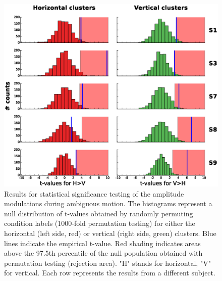 \begin{figure}[htbp!]
\centering
\includegraphics[width=\textwidth]{figures/chapter_03_SI/figS4.eps}
\caption{Results for statistical significance testing of the amplitude modulations during ambiguous motion. The histograms represent a null distribution of t-values obtained by randomly permuting condition labels (1000-fold permutation testing) for either the horizontal (left side, red) or vertical (right side, green) clusters. Blue lines indicate the empirical t-value. Red shading indicates areas above the 97.5th percentile of the null population obtained with permutation testing (rejection area). "H" stands for horizontal, "V" for vertical. Each row represents the results from a different subject.}
\label{fig:fig2C_supp}
\end{figure}

